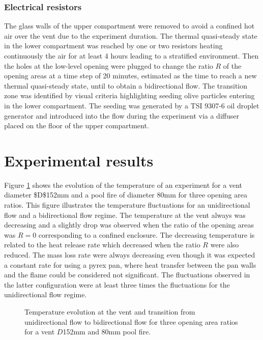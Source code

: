 \documentclass[preprint,12pt]{elsarticle}
\begin{document}
\subsubsection*{Electrical resistors}
The glass walls of the upper compartment were removed to avoid a confined hot air over the vent due to the experiment duration. The thermal quasi-steady state in the lower compartment was reached by one or two resistors heating continuously the air for at least 4 hours leading to a stratified environment. Then the holes at the low-level opening were plugged to change the ratio \(R\) of the opening areas at a time step of 20 minutes, estimated as the time to reach a new thermal quasi-steady state, until to obtain a bidirectional flow. The transition zone was identified by visual criteria highlighting seeding olive particles entering in the lower compartment. The seeding was generated by a TSI 9307-6 oil droplet generator and introduced into the flow during the experiment via a diffuser placed on the floor of the upper compartment.

\section{Experimental results}
\label{sec:orgce3eaac}
Figure \ref{fig:evol_mono-bidi_N} shows the evolution of the temperature of an experiment for a vent diameter \$D\$152mm and a pool fire of diameter 80mm for three opening area ratios. This figure illustrates the temperature fluctuations for an unidirectional flow and a bidirectional flow regime. The temperature at the vent always was decreasing and a slightly drop was observed when the ratio of the opening areas was \(R=0\) corresponding to a confined enclosure. The decreasing temperature is related to the heat release rate which decreased when the ratio \(R\) were also reduced. The mass loss rate were always decreasing even though it was expected a constant rate for using a pyrex pan, where heat transfer between the pan walls and the flame could be considered not significant. The fluctuations observed in the latter configuration were at least three times the fluctuations for the unidirectional flow regime.

\begin{figure}[h]
\centering
\resizebox{0.5\textwidth}{!}{}
\caption{Temperature evolution at the vent and transition from unidirectional flow to bidirectional flow for three opening area ratios for a vent $D$152mm and 80mm pool fire.}
\label{fig:evol_mono-bidi_N}
\end{figure}
\end{document}
